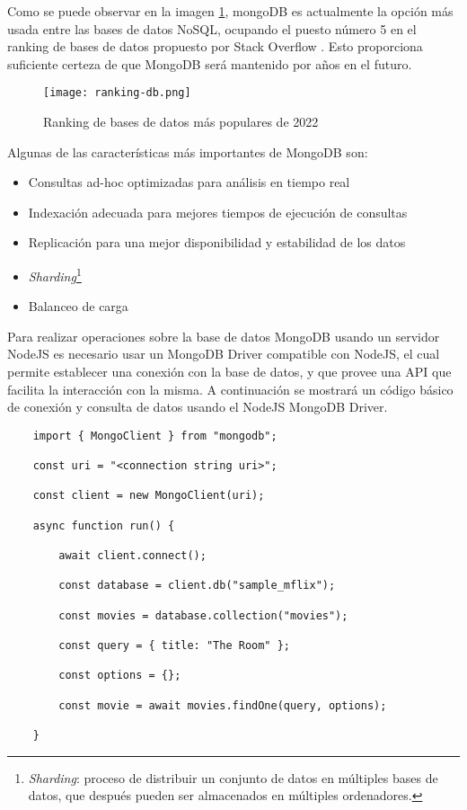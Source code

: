 Como se puede observar en la imagen \ref{fig:ranking-db}, mongoDB es actualmente la opción más usada entre las bases de datos NoSQL, ocupando el puesto número 5 en el ranking de bases de datos propuesto por Stack Overflow \cite{StackOverflowSurvey}. Esto proporciona suficiente certeza de que MongoDB será mantenido por años en el futuro.

\begin{figure}[H]
    \centering
    \texttt{[image: ranking-db.png]}
    \caption{Ranking de bases de datos más populares de 2022}
    \label{fig:ranking-db}
\end{figure}

Algunas de las características más importantes de MongoDB son:

\begin{itemize}
  \item Consultas ad-hoc optimizadas para análisis en tiempo real
  \item Indexación adecuada para mejores tiempos de ejecución de consultas
  \item Replicación para una mejor disponibilidad y estabilidad de los datos
  \item \textit{Sharding}\footnote{\textit{Sharding}: proceso de distribuir un conjunto de datos en múltiples bases de datos, que después pueden ser almacenados en múltiples ordenadores.}
  \item Balanceo de carga
\end{itemize}

Para realizar operaciones sobre la base de datos MongoDB usando un servidor NodeJS es necesario usar un MongoDB Driver compatible con NodeJS, el cual permite establecer una conexión con la base de datos, y que provee una API que facilita la interacción con la misma. A continuación se mostrará un código básico de conexión y consulta de datos usando el NodeJS MongoDB Driver.

\begin{lstlisting}
    import { MongoClient } from "mongodb";

    const uri = "<connection string uri>";

    const client = new MongoClient(uri);

    async function run() {

        await client.connect();

        const database = client.db("sample_mflix");

        const movies = database.collection("movies");

        const query = { title: "The Room" };

        const options = {};

        const movie = await movies.findOne(query, options);

    }
\end{lstlisting}

